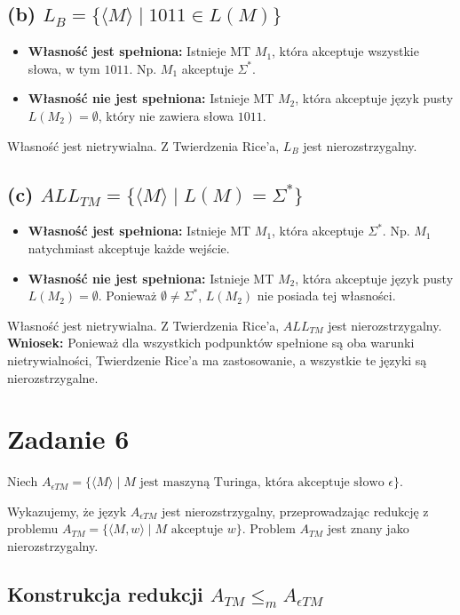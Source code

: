\documentclass{article}
\begin{document}
\subsection*{(b) $L_B = \{\langle M \rangle \mid 1011 \in L(M)\}$}

\begin{itemize}
    \item \textbf{Własność jest spełniona:} Istnieje MT $M_1$, która akceptuje wszystkie słowa, w tym $1011$. Np. $M_1$ akceptuje $\Sigma^*$.
    \item \textbf{Własność nie jest spełniona:} Istnieje MT $M_2$, która akceptuje język pusty $L(M_2)=\emptyset$, który nie zawiera słowa $1011$.
\end{itemize}
Własność jest nietrywialna. Z Twierdzenia Rice’a, $L_B$ jest nierozstrzygalny.

\subsection*{(c) $ALL_{TM} = \{\langle M \rangle \mid L(M) = \Sigma^*\}$}

\begin{itemize}
    \item \textbf{Własność jest spełniona:} Istnieje MT $M_1$, która akceptuje $\Sigma^*$. Np. $M_1$ natychmiast akceptuje każde wejście.
    \item \textbf{Własność nie jest spełniona:} Istnieje MT $M_2$, która akceptuje język pusty $L(M_2)=\emptyset$. Ponieważ $\emptyset \neq \Sigma^*$, $L(M_2)$ nie posiada tej własności.
\end{itemize}
Własność jest nietrywialna. Z Twierdzenia Rice’a, $ALL_{TM}$ jest nierozstrzygalny.
\\
\textbf{Wniosek:} Ponieważ dla wszystkich podpunktów spełnione są oba warunki nietrywialności, Twierdzenie Rice'a ma zastosowanie, a wszystkie te języki są nierozstrzygalne.

\section{Zadanie 6}
Niech $A_{\epsilon TM} = \{\langle M \rangle \mid M \text{ jest maszyną Turinga, która akceptuje słowo } \epsilon\}$.

Wykazujemy, że język $A_{\epsilon TM}$ jest nierozstrzygalny, przeprowadzając redukcję z problemu $A_{TM} = \{\langle M, w \rangle \mid M \text{ akceptuje } w\}$. Problem $A_{TM}$ jest znany jako nierozstrzygalny.

\subsection*{Konstrukcja redukcji $A_{TM} \le_m A_{\epsilon TM}$}
\end{document}
